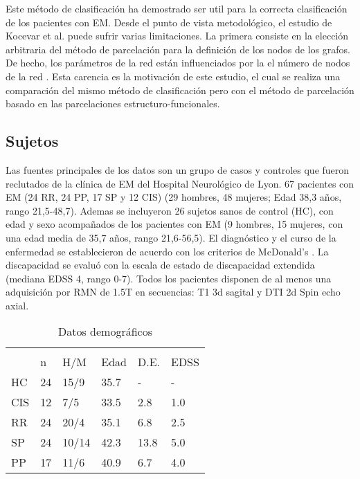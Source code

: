 \documentclass[fleqn,10pt]{UICArticle} %
\begin{document}
Este método de clasificación ha demostrado ser util para la correcta clasificación de los pacientes con EM. Desde el punto de vista metodológico, el estudio de Kocevar et al. \cite{Kocevar2016} puede sufrir varias limitaciones. La primera consiste en la elección arbitraria del método de parcelación para la definición de los nodos de los grafos. De hecho, los parámetros de la red están influenciados por la el número de nodos de la red \cite{Zalesky2010}. Esta carencia es la motivación de este estudio, el cual se realiza una comparación del mismo método de clasificación pero con el método de parcelación basado en las parcelaciones estructuro-funcionales.

\subsection{Sujetos}
Las fuentes principales de los datos son un grupo de casos y controles que fueron reclutados de la clínica de EM del Hospital Neurológico de Lyon. 67 pacientes con EM (24 RR, 24 PP, 17 SP y 12 CIS) (29 hombres, 48 mujeres; Edad 38,3 años, rango 21,5-48,7). Ademas se incluyeron 26 sujetos sanos de control (HC), con edad y sexo acompañados de los pacientes con EM (9 hombres, 15 mujeres, con una edad media de 35,7 años, rango 21,6-56,5). El diagnóstico y el curso de la enfermedad se establecieron de acuerdo con los criterios de McDonald's \cite{Polman2011}. La discapacidad se evaluó con la escala de estado de discapacidad extendida (mediana EDSS 4, rango 0-7). Todos los pacientes disponen de al menos una adquisición por RMN de 1.5T en secuencias: T1 3d sagital y DTI 2d Spin echo axial.

\begin{table}[hbt]
\caption{Datos demográficos}
\centering
\begin{tabular}{llllll}
\toprule
\multicolumn{6}{l}{} \\
     & n   & H/M    & Edad  & D.E.  & EDSS  \\
HC   & 24  & 15/9   & 35.7  & -     & -     \\
CIS  & 12  & 7/5    & 33.5  & 2.8   & 1.0   \\
RR   & 24  & 20/4   & 35.1  & 6.8   & 2.5   \\
SP   & 24  & 10/14  & 42.3  & 13.8  & 5.0   \\
PP   & 17  & 11/6   & 40.9  & 6.7   & 4.0   \\
\bottomrule
\end{tabular}
\label{tab:label}
\end{table}
\end{document}
